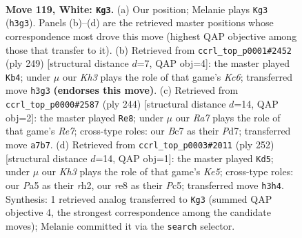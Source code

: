 \documentclass[11pt]{article}
\begin{document}
\clearpage

\begin{figure}[p]\centering
\begin{subfigure}{0.46\textwidth}\centering
\resizebox{\linewidth}{!}{%
\newchessgame
\chessboard[
  setfen={4r3/R1B4k/8/P7/8/7K/8/8 w - - 7 119},
  showmover=false,
  pgfstyle=straightmove, color=movearrow, markmove={h3-g3}
]}
\caption{}
\end{subfigure}\hfill
\begin{subfigure}{0.46\textwidth}\centering
\resizebox{\linewidth}{!}{%
\newchessgame
\chessboard[
  setfen={8/p1r5/8/2b5/B7/2k4R/4K3/8 b - - 45 125},
  showmover=false,
  pgfstyle=straightmove, color=movearrow, markmove={c3-b4}
]}
\caption{}
\end{subfigure}
\\[4pt]
\begin{subfigure}{0.46\textwidth}\centering
\resizebox{\linewidth}{!}{%
\newchessgame
\chessboard[
  setfen={8/3PR3/2K4p/5k2/8/8/8/3r4 w - - 13 123},
  showmover=false,
  pgfstyle=straightmove, color=movearrow, markmove={e7-e8}
]}
\caption{}
\end{subfigure}\hfill
\begin{subfigure}{0.46\textwidth}\centering
\resizebox{\linewidth}{!}{%
\newchessgame
\chessboard[
  setfen={8/k7/P7/R1P1K3/8/8/7r/8 w - - 77 127},
  showmover=false,
  pgfstyle=straightmove, color=movearrow, markmove={e5-d5}
]}
\caption{}
\end{subfigure}
\caption{\textbf{Move 119, White: \texttt{Kg3}.} (a) Our position; Melanie plays \texttt{Kg3} (\texttt{h3g3}). Panels (b)--(d) are the retrieved master positions whose correspondence most drove this move (highest QAP objective among those that transfer to it). (b) Retrieved from \texttt{ccrl\_top\_p0001\#2452} (ply 249) [structural distance $d$=7, QAP obj=4]: the master played \texttt{Kb4}; under $\mu$ our \emph{Kh3} plays the role of that game's \emph{Kc6}; transferred move \texttt{h3g3} \textbf{(endorses this move)}. (c) Retrieved from \texttt{ccrl\_top\_p0000\#2587} (ply 244) [structural distance $d$=14, QAP obj=2]: the master played \texttt{Re8}; under $\mu$ our \emph{Ra7} plays the role of that game's \emph{Re7}; cross-type roles: our \emph{B}c7 as their \emph{P}d7; transferred move \texttt{a7b7}. (d) Retrieved from \texttt{ccrl\_top\_p0003\#2011} (ply 252) [structural distance $d$=14, QAP obj=1]: the master played \texttt{Kd5}; under $\mu$ our \emph{Kh3} plays the role of that game's \emph{Ke5}; cross-type roles: our \emph{P}a5 as their \emph{r}h2, our \emph{r}e8 as their \emph{P}c5; transferred move \texttt{h3h4}. Synthesis: 1 retrieved analog transferred to \texttt{Kg3} (summed QAP objective 4, the strongest correspondence among the candidate moves); Melanie committed it via the \texttt{search} selector.}
\label{fig:thought-m236}
\end{figure}
\end{document}
